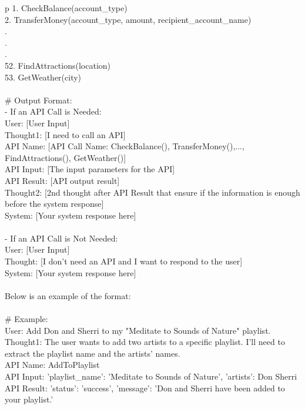 \begin{table*}[!t]
\begin{tabular}{p\linewidth}
1. CheckBalance(account\_type) \\
2. TransferMoney(account\_type, amount, recipient\_account\_name) \\
. \\
. \\
. \\
52. FindAttractions(location) \\
53. GetWeather(city) \\
 \\
\# Output Format: \\
- If an API Call is Needed: \\
\quad	    User: [User Input] \\
\quad	    Thought1: [I need to call an API] \\
\quad	    API Name: [API Call Name: CheckBalance(), TransferMoney(),...,  FindAttractions(), GetWeather()] \\
\quad	    API Input: [The input parameters for the API] \\
\quad	    API Result: [API output result] \\
\quad	    Thought2: [2nd thought after API Result that ensure if the information is enough before the system response] \\
\quad	    System: [Your system response here] \\
 \\
- If an API Call is Not Needed: \\
\quad	    User: [User Input] \\
\quad	    Thought: [I don't need an API and I want to respond to the user] \\
\quad	    System: [Your system response here] \\
 \\
Below is an example of the format: \\
 \\
\# Example: \\
User: Add Don and Sherri to my "Meditate to Sounds of Nature" playlist.   \\
Thought1: The user wants to add two artists to a specific playlist. I'll need to extract the playlist name and the artists' names.  \\ 
API Name: AddToPlaylist   \\
API Input: {'playlist\_name': 'Meditate to Sounds of Nature', 'artists': Don Sherri}   \\
API Result: {'status': 'success', 'message': 'Don and Sherri have been added to your playlist.'}   \\

\end{tabular}
\end{table*}

